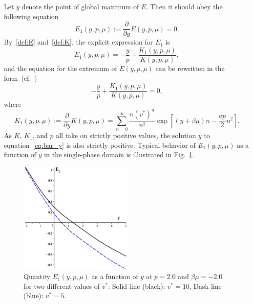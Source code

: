 \documentclass[12pt]{article}
\numberwithin{equation}{section}
\begin{document}
	Let $\bar{y}$ denote the point of global maximum of $E$. Then it should obey the following equation
	\begin{equation}
		\label{def:E1}
		E_1(y,p,\mu) := \frac{\partial}{\partial y} E(y,p,\mu) = 0.
	\end{equation}
	By~\eqref{def:E} and~\eqref{def:K}, the explicit expression for $E_1$ is
	\begin{equation}
		E_1(y,p,\mu) = -\frac{y}{p} + \frac{K_1(y,p,\mu)}{K(y,p,\mu)},
	\end{equation}	
	and the equation for the extremum of $E(y,p,\mu)$ can be rewritten in the form~(cf.~\cite[(2.19)]{KKD20})
	\begin{equation}
		\label{eq:bar_y}
		-\frac{y}{p} + \frac{K_1(y,p,\mu)}{K(y,p,\mu)} = 0,
	\end{equation}
	where
	\begin{equation}
		K_1(y,p,\mu) := \frac{\partial}{\partial y} K(y,p,\mu) = \sum_{n=0}^{\infty} \frac{n (v^*)^n}{n!} \exp[(y+\beta\mu)n - \frac{ap}{2}n^2].
	\end{equation}
	As $K$, $K_1$, and $p$ all take on strictly positive values, the solution $\bar{y}$ to equation~\eqref{eq:bar_y} is also strictly positive.
	Typical behavior of $E_1(y,p,\mu)$ as a function of $y$ in the single-phase domain is illustrated in Fig.~\ref{fig:E1_vs_y}.
	\begin{figure}[htbp]
		\includegraphics[width=0.5\textwidth,angle=0]{E1_vs_y}
		\centering
		\captionsetup{width=0.6\textwidth}
		\caption{Quantity $E_1(y,p,\mu)$ as a function of $y$ at $p=2.0$ and $\beta\mu=-2.0$ for two different values of $v^*$: Solid line (black): $v^* = 10$, Dash line (blue): $v^* = 5$.}
		\label{fig:E1_vs_y}
	\end{figure}
\end{document}
